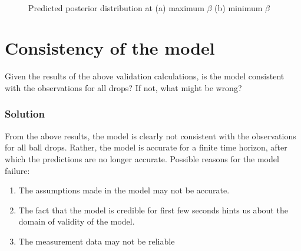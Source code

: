 \documentclass{article}
\begin{document}
\begin{figure}[H]
\begin{centering}
\,\,\,
\par\end{centering}

\caption{Predicted posterior distribution at (a) maximum $\beta$ (b) minimum
$\beta$}


\label{balldrop1t5-3-3}
\end{figure}



\section{Consistency of the model}

Given the results of the above validation calculations, is the model
consistent with the observations for all drops? If not, what might
be wrong?


\subsubsection*{Solution}

From the above results, the model is clearly not consistent with the
observations for all ball drops. Rather, the model is accurate for
a finite time horizon, after which the predictions are no longer accurate.
Possible reasons for the model failure:
\begin{enumerate}
\item The assumptions made in the model may not be accurate.
\item The fact that the model is credible for first few seconds hints us
about the domain of validity of the model.
\item The measurement data may not be reliable\end{enumerate}
\end{document}
